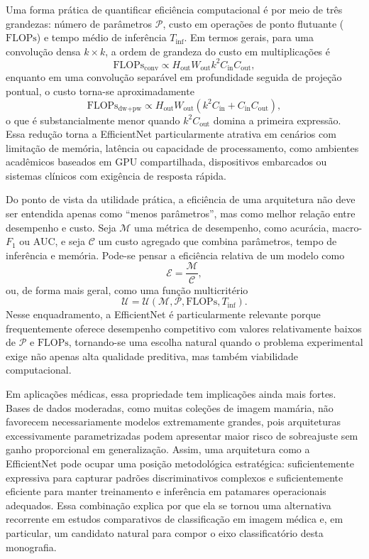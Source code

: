 \documentclass[tcc,capa]{texufpel}
\begin{document}
Uma forma prática de quantificar eficiência computacional é por meio de três grandezas: número de parâmetros \(\mathcal{P}\), custo em operações de ponto flutuante (\(\text{FLOPs}\)) e tempo médio de inferência \(T_{\text{inf}}\). Em termos gerais, para uma convolução densa \(k\times k\), a ordem de grandeza do custo em multiplicações é
\begin{equation}
	\text{FLOPs}_{\text{conv}}
	\propto
	H_{\text{out}}W_{\text{out}}k^2 C_{\text{in}} C_{\text{out}},
\end{equation}
enquanto em uma convolução separável em profundidade seguida de projeção pontual, o custo torna-se aproximadamente
\begin{equation}
	\text{FLOPs}_{\text{dw+pw}}
	\propto
	H_{\text{out}}W_{\text{out}}
	\left(
	k^2 C_{\text{in}} + C_{\text{in}}C_{\text{out}}
	\right),
\end{equation}
o que é substancialmente menor quando \(k^2 C_{\text{out}}\) domina a primeira expressão. Essa redução torna a EfficientNet particularmente atrativa em cenários com limitação de memória, latência ou capacidade de processamento, como ambientes acadêmicos baseados em GPU compartilhada, dispositivos embarcados ou sistemas clínicos com exigência de resposta rápida.

Do ponto de vista da utilidade prática, a eficiência de uma arquitetura não deve ser entendida apenas como “menos parâmetros”, mas como melhor relação entre desempenho e custo. Seja \(\mathcal{M}\) uma métrica de desempenho, como acurácia, macro-\(F_1\) ou AUC, e seja \(\mathcal{C}\) um custo agregado que combina parâmetros, tempo de inferência e memória. Pode-se pensar a eficiência relativa de um modelo como
\begin{equation}
	\mathcal{E} = \frac{\mathcal{M}}{\mathcal{C}},
\end{equation}
ou, de forma mais geral, como uma função multicritério
\begin{equation}
	\mathcal{U} = \mathcal{U}(\mathcal{M},\mathcal{P},\text{FLOPs},T_{\text{inf}}).
\end{equation}
Nesse enquadramento, a EfficientNet é particularmente relevante porque frequentemente oferece desempenho competitivo com valores relativamente baixos de \(\mathcal{P}\) e \(\text{FLOPs}\), tornando-se uma escolha natural quando o problema experimental exige não apenas alta qualidade preditiva, mas também viabilidade computacional.

Em aplicações médicas, essa propriedade tem implicações ainda mais fortes. Bases de dados moderadas, como muitas coleções de imagem mamária, não favorecem necessariamente modelos extremamente grandes, pois arquiteturas excessivamente parametrizadas podem apresentar maior risco de sobreajuste sem ganho proporcional em generalização. Assim, uma arquitetura como a EfficientNet pode ocupar uma posição metodológica estratégica: suficientemente expressiva para capturar padrões discriminativos complexos e suficientemente eficiente para manter treinamento e inferência em patamares operacionais adequados. Essa combinação explica por que ela se tornou uma alternativa recorrente em estudos comparativos de classificação em imagem médica e, em particular, um candidato natural para compor o eixo classificatório desta monografia.
\end{document}
